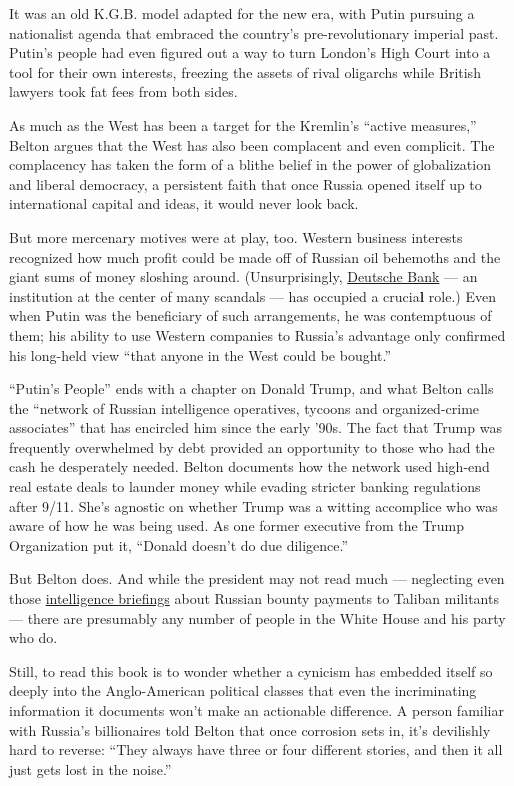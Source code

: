 It was an old K.G.B. model adapted for the new era, with Putin pursuing
a nationalist agenda that embraced the country's pre-revolutionary
imperial past. Putin's people had even figured out a way to turn
London's High Court into a tool for their own interests, freezing the
assets of rival oligarchs while British lawyers took fat fees from both
sides.

As much as the West has been a target for the Kremlin's ``active
measures,'' Belton argues that the West has also been complacent and
even complicit. The complacency has taken the form of a blithe belief in
the power of globalization and liberal democracy, a persistent faith
that once Russia opened itself up to international capital and ideas, it
would never look back.

But more mercenary motives were at play, too. Western business interests
recognized how much profit could be made off of Russian oil behemoths
and the giant sums of money sloshing around. (Unsurprisingly,
\href{https://www.nytimes3xbfgragh.onion/2020/02/14/books/review/dark-towers-deutsche-bank-david-enrich.html}{Deutsche
Bank} --- an institution at the center of many scandals --- has occupied
a crucia\textbf{l} role.) Even when Putin was the beneficiary of such
arrangements, he was contemptuous of them; his ability to use Western
companies to Russia's advantage only confirmed his long-held view ``that
anyone in the West could be bought.''

``Putin's People'' ends with a chapter on Donald Trump, and what Belton
calls the ``network of Russian intelligence operatives, tycoons and
organized-crime associates'' that has encircled him since the early
'90s. The fact that Trump was frequently overwhelmed by debt provided an
opportunity to those who had the cash he desperately needed. Belton
documents how the network used high-end real estate deals to launder
money while evading stricter banking regulations after 9/11. She's
agnostic on whether Trump was a witting accomplice who was aware of how
he was being used. As one former executive from the Trump Organization
put it, ``Donald doesn't do due diligence.''

But Belton does. And while the president may not read much ---
neglecting even those
\href{https://www.nytimes3xbfgragh.onion/2020/06/29/us/politics/russian-bounty-trump.html}{intelligence
briefings} about Russian bounty payments to Taliban militants --- there
are presumably any number of people in the White House and his party who
do.

Still, to read this book is to wonder whether a cynicism has embedded
itself so deeply into the Anglo-American political classes that even the
incriminating information it documents won't make an actionable
difference. A person familiar with Russia's billionaires told Belton
that once corrosion sets in, it's devilishly hard to reverse: ``They
always have three or four different stories, and then it all just gets
lost in the noise.''


